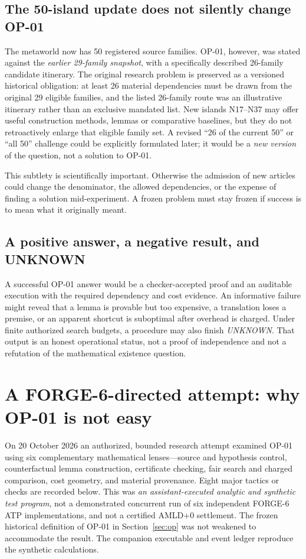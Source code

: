 \documentclass[11pt,letterpaper,oneside]{article}
\begin{document}
\subsection{The 50-island update does not silently change OP-01}
The metaworld now has 50 registered source families. OP-01, however, was stated against the \emph{earlier 29-family snapshot}, with a specifically described 26-family candidate itinerary. The original research problem is preserved as a versioned historical obligation: at least 26 material dependencies must be drawn from the original 29 eligible families, and the listed 26-family route was an illustrative itinerary rather than an exclusive mandated list. New islands N17--N37 may offer useful construction methods, lemmas or comparative baselines, but they do not retroactively enlarge that eligible family set. A revised ``26 of the current 50'' or ``all 50'' challenge could be explicitly formulated later; it would be a \emph{new version} of the question, not a solution to OP-01.

This subtlety is scientifically important. Otherwise the admission of new articles could change the denominator, the allowed dependencies, or the expense of finding a solution mid-experiment. A frozen problem must stay frozen if success is to mean what it originally meant.

\subsection{A positive answer, a negative result, and UNKNOWN}
A successful OP-01 answer would be a checker-accepted proof and an auditable execution with the required dependency and cost evidence. An informative failure might reveal that a lemma is provable but too expensive, a translation loses a premise, or an apparent shortcut is suboptimal after overhead is charged. Under finite authorized search budgets, a procedure may also finish \emph{UNKNOWN}. That output is an honest operational status, not a proof of independence and not a refutation of the mathematical existence question.


\section{A FORGE-6-directed attempt: why OP-01 is not easy}\label{sec:attempt}
On 20 October 2026 an authorized, bounded research attempt examined OP-01 using six complementary mathematical lenses---source and hypothesis control, counterfactual lemma construction, certificate checking, fair search and charged comparison, cost geometry, and material provenance. Eight major tactics or checks are recorded below. This was \emph{an assistant-executed analytic and synthetic test program}, not a demonstrated concurrent run of six independent FORGE-6 ATP implementations, and not a certified AMLD+0 settlement. The frozen historical definition of OP-01 in Section~\ref{sec:op} was not weakened to accommodate the result. The companion executable and event ledger reproduce the synthetic calculations.
\end{document}
